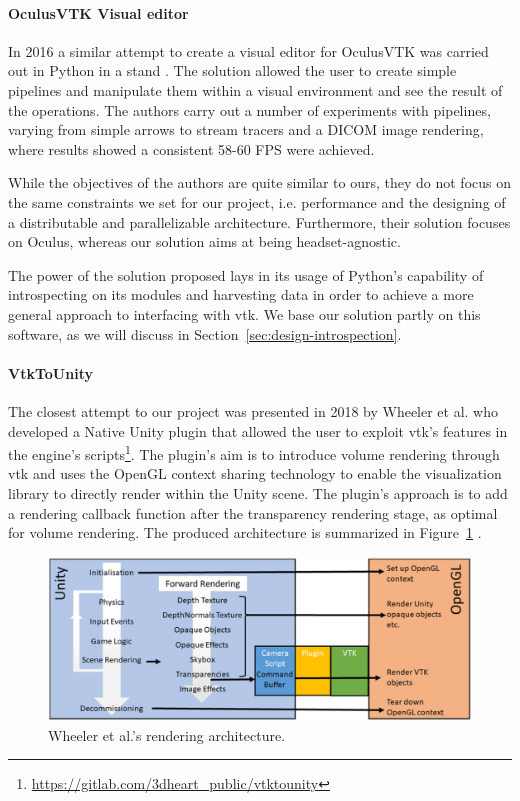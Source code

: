 \paragraph{OculusVTK Visual editor}

In 2016 a similar attempt to create a visual editor for OculusVTK was carried out in Python in a stand \cite{dreuning_visual_2016}. The solution allowed the user to create simple pipelines and manipulate them within a visual environment and see the result of the operations. The authors carry out a number of experiments with pipelines, varying from simple arrows to stream tracers and a DICOM image rendering, where results showed a consistent 58-60 FPS were achieved.

While the objectives of the authors are quite similar to ours, they do not focus on the same constraints we set for our project, i.e. performance and the designing of a distributable and parallelizable architecture. Furthermore, their solution focuses on Oculus, whereas our solution aims at being headset-agnostic.

The power of the solution proposed lays in its usage of Python's capability of introspecting on its modules and harvesting data in order to achieve a more general approach to interfacing with \acrshort{vtk}. We base our solution partly on this software, as we will discuss in Section~\ref{sec:design-introspection}.

\paragraph{VtkToUnity}

The closest attempt to our project was presented in 2018 by Wheeler et al. who developed a Native Unity plugin that allowed the user to exploit \acrshort{vtk}'s features in the engine's scripts\footnote{\url{https://gitlab.com/3dheart_public/vtktounity}}. The plugin's aim is to introduce volume rendering through \acrshort{vtk} and uses the OpenGL context sharing technology to enable the visualization library to directly render within the Unity scene. The plugin's approach is to add a rendering callback function after the transparency rendering stage, as optimal for volume rendering. The produced architecture is summarized in Figure~\ref{fig:wheeler-architecture} \cite{wheeler_virtual_2018}.

\begin{figure}
    \centering
    \includegraphics[width=\textwidth]{pictures/wheeler_arch.PNG}
    \caption{Wheeler et al.'s rendering architecture.}
    \label{fig:wheeler-architecture}
\end{figure}

